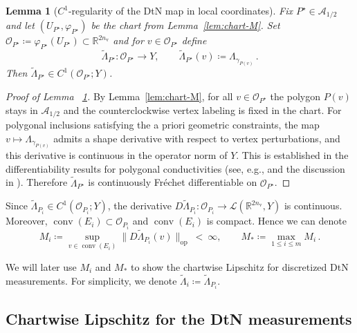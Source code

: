 \documentclass{article}
\newcommand{\R}{\mathbb{R}}
\newtheorem{lemma}[theorem]{Lemma}
\begin{document}
\begin{lemma}[$C^1$-regularity of the DtN map in local coordinates]\label{lem:DtN-C1-chart}
Fix $P^\star\in\mathcal A_{1/2}$ and let $(U_{P^\star},\varphi_{P^\star})$ be the chart from Lemma~\ref{lem:chart-M}. Set $\mathcal O_{P^\star}\coloneqq \varphi_{P^\star}(U_{P^\star})\subset\mathbb R^{2n_{\mathrm v}}$ and for $v \in \mathcal{O}_{P^\star}$ define
\[
\widetilde\Lambda_{P^\star}:\mathcal O_{P^\star}\to Y,\qquad
\widetilde\Lambda_{P^\star}(v)\coloneqq \Lambda_{\gamma_{P(v)}}\,.
\]
Then $\widetilde\Lambda_{P^\star}\in C^1(\mathcal O_{P^\star};Y)$.
\end{lemma}


\begin{proof}[Proof of Lemma ~\ref{lem:DtN-C1-chart}]
By Lemma~\ref{lem:chart-M}, for all $v\in\mathcal O_{P^\star}$ the polygon $P(v)$ stays in $\mathcal A_{1/2}$ and the
counterclockwise vertex labeling is fixed in the chart.
For polygonal inclusions satisfying the a priori geometric constraints, the map $v\mapsto\Lambda_{\gamma_{P(v)}}$ admits
a shape derivative with respect to vertex perturbations, and this derivative is continuous in the operator norm of
$Y$. This is established in the differentiability results for polygonal conductivities (see, e.g.,
\citealp[Lem.~4.4 and Cor.~4.5]{beretta2017differentiability} and the discussion in \citealp[Sec.~8.1]{alberti2022inverse}).
Therefore $\widetilde\Lambda_{P^\star}$ is continuously Fr\'{e}chet differentiable on $\mathcal O_{P^\star}$.
\end{proof}

Since $\widetilde\Lambda_{P_i}\in C^1(\mathcal O_{P_i};Y)$, the derivative
$D\widetilde\Lambda_{P_i}:\mathcal O_{
P_i}\to \mathcal L(\R^{2n_{\mathrm{v}}},Y)$ is continuous.
Moreover, $\operatorname{conv}(E_i)\subset \mathcal O_{P_i}$ and $\operatorname{conv}(E_i)$ is compact.
Hence we can denote
\begin{equation}
    M_i \coloneqq  \sup_{v\in \operatorname{conv}(E_i)}\big\|D\widetilde\Lambda_{P_i}(v)\big\|_{\mathrm{op}} \ <\ \infty,
\qquad
M_*\coloneqq \max_{1\le i\le m}M_i\,.
\end{equation}


We will later use $M_i$ and $M_*$ to show the chartwise Lipschitz for discretized DtN measurements. For simplicity, we denote $\widetilde\Lambda_{i}\coloneqq \widetilde\Lambda_{P_i}$.



\subsection{Chartwise Lipschitz for the DtN measurements}\label{sec:chartwise_lipschitz_discretized_DtN}
\end{document}
